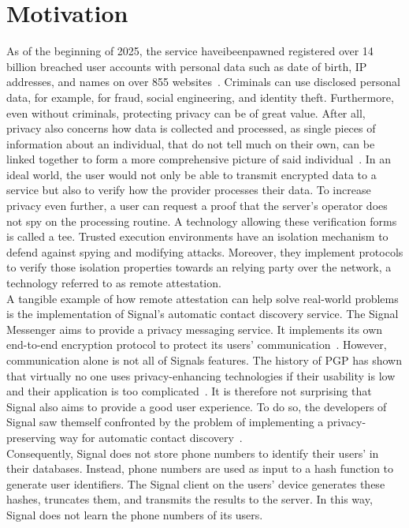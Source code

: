 \section{Motivation}
\label{sec:10:motivation}
As of the beginning of 2025, the service haveibeenpawned registered over 14
billion breached user accounts with personal data such as date of birth, IP
addresses, and names on over 855 websites~\cite{haveibeenpawned}. Criminals can
use disclosed personal data, for example, for fraud, social engineering, and
identity theft. Furthermore, even without criminals, protecting privacy can be
of great value. After all, privacy also concerns how data is collected and
processed, as single pieces of information about an individual, that do not tell
much on their own, can be linked together to form a more comprehensive picture
of said individual~\cite{solove2007ve}. In an ideal world, the user would not
only be able to transmit encrypted data to a service but also to verify how the
provider processes their data. To increase privacy even further, a user can
request a proof that the server's operator does not spy on the processing
routine. A technology allowing these verification forms is called a \gls{tee}.
Trusted execution environments have an isolation mechanism to defend against
spying and modifying attacks. Moreover, they implement protocols to verify those
isolation properties towards an relying party over the network, a technology
referred to as remote attestation. \\

A tangible example of how remote attestation can help solve real-world problems
is the implementation of Signal's automatic contact discovery service. The
Signal Messenger aims to provide a privacy messaging service. It implements its
own end-to-end encryption protocol to protect its users'
communication~\cite{cohn2020formal}. However, communication alone is not all of
Signals features. The history of PGP has shown that virtually no one uses
privacy-enhancing technologies if their usability is low and their application
is too complicated~\cite{ruoti2015johnny}. It is therefore not surprising that
Signal also aims to provide a good user experience. To do so, the developers of
Signal saw themself confronted by the problem of implementing a
privacy-preserving way for automatic contact discovery~\cite{SignalCd}.\\

Consequently, Signal does not store phone numbers to identify their users' in
their databases. Instead, phone numbers are used as input to a hash function to
generate user identifiers. The Signal client on the users' device generates
these hashes, truncates them, and transmits the results to the server. In this
way, Signal does not learn the phone numbers of its users.\\

